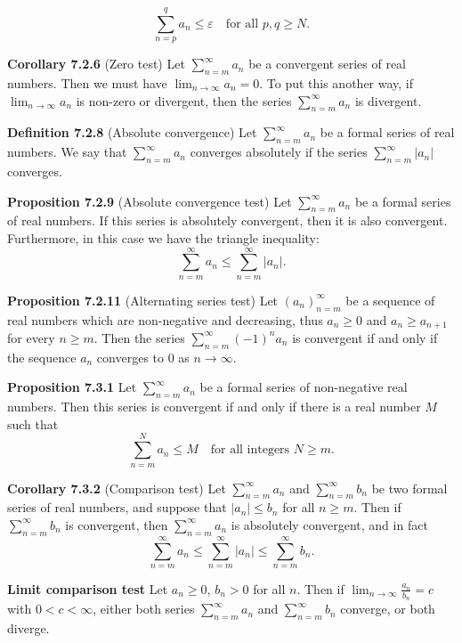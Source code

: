 \documentclass{article}
\begin{document}
\[
    \sum_{n=p}^{q} a_n \leq \varepsilon \quad \text{for all } p, q \geq N.
\]

\medskip

\textbf{Corollary 7.2.6} (Zero test) Let $\sum_{n=m}^{\infty} a_n$ be a
convergent series of real numbers.
Then we must have
\(
\lim_{n \to \infty} a_n = 0.
\)
To put this another way, if $\lim_{n \to \infty} a_n$ is non-zero or
divergent, then the series $\sum_{n=m}^{\infty} a_n$ is divergent.

\medskip

\textbf{Definition 7.2.8} (Absolute convergence) Let $\sum_{n=m}^{\infty} a_n$
be a formal series of real numbers.
We say that $\sum_{n=m}^{\infty} a_n$ converges absolutely if the series
$\sum_{n=m}^{\infty} |a_n|$ converges.

\medskip

\textbf{Proposition 7.2.9} (Absolute convergence test) Let $\sum_{n=m}^{\infty} a_n$
be a formal series of real numbers.
If this series is absolutely convergent, then it is also convergent. Furthermore,
in this case we have the triangle inequality:
\[
    \sum_{n=m}^{\infty} a_n \leq \sum_{n=m}^{\infty} |a_n|.
\]

\medskip

\textbf{Proposition 7.2.11} (Alternating series test) Let $(a_n)_{n=m}^{\infty}$
be a sequence of real numbers which are non-negative and decreasing,
thus $a_n \geq 0$ and $a_n \geq a_{n+1}$ for every $n \geq m$.
Then the series $\sum_{n=m}^{\infty} (-1)^n a_n$ is convergent if and
only if the sequence $a_n$ converges to $0$ as $n \to \infty$.

\medskip

\textbf{Proposition 7.3.1} Let $\sum_{n=m}^{\infty} a_n$ be a formal series of
non-negative real numbers.
Then this series is convergent if and only if there is a real number $M$ such that
\[
    \sum_{n=m}^{N} a_n \leq M \quad \text{for all integers } N \geq m.
\]

\medskip

\textbf{Corollary 7.3.2} (Comparison test) Let $\sum_{n=m}^{\infty} a_n$ and
$\sum_{n=m}^{\infty} b_n$ be two formal series of real numbers, and suppose
that $|a_n| \leq b_n$ for all $n \geq m$.
Then if $\sum_{n=m}^{\infty} b_n$ is convergent, then $\sum_{n=m}^{\infty} a_n$
is absolutely convergent, and in fact
\[
    \sum_{n=m}^{\infty} a_n \leq \sum_{n=m}^{\infty} |a_n| \leq \sum_{n=m}^{\infty} b_n.
\]

\medskip

\textbf{Limit comparison test}
Let $a_n \geq 0$, $b_n > 0$ for all $n$. Then if
$\lim_{n \to \infty} \frac{a_n}{b_n} = c$ with $0 < c < \infty$,
either both series $\sum_{n=m}^{\infty} a_n$ and
$\sum_{n=m}^{\infty} b_n$ converge, or both diverge.
\end{document}
